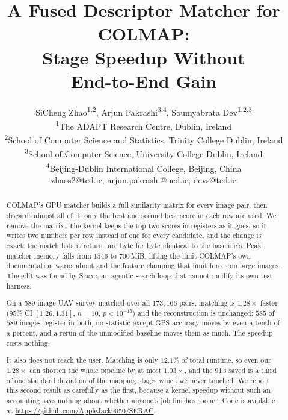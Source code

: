 \documentclass[conference]{IEEEtran}
\newcommand{\sys}{\textnormal{\textsc{Serac}}\xspace}
\begin{document}
\title{A Fused Descriptor Matcher for COLMAP:\\
Stage Speedup Without\\
End-to-End Gain}

\author{SiCheng Zhao\textsuperscript{1,2}, Arjun Pakrashi\textsuperscript{3,4}, Soumyabrata Dev\textsuperscript{1,2,3} \vspace{0.5em}\\ \textsuperscript{1}The ADAPT Research Centre, Dublin, Ireland\\
\textsuperscript{2}School of Computer Science and Statistics, Trinity College Dublin, Ireland\\
\textsuperscript{3}School of Computer Science, University College Dublin, Ireland\\
\textsuperscript{4}Beijing-Dublin International College, Beijing, China\\
zhaos2@tcd.ie, arjun.pakrashi@ucd.ie, devs@tcd.ie}

\maketitle

\begin{abstract}
COLMAP's GPU matcher builds a full similarity matrix for every image pair, then
discards almost all of it: only the best and second best score in each row are
used. We remove the matrix. The kernel keeps the top two scores in registers as
it goes, so it writes two numbers per row instead of one for every candidate,
and the change is exact: the match lists it returns are byte for byte identical
to the baseline's. Peak matcher memory falls from $1546$ to $700$\,MiB, lifting
the limit COLMAP's own documentation warns about and the feature clamping that
limit forces on large images. The edit was found by \sys, an agentic search
loop that cannot modify its own test harness.

On a 589 image UAV survey matched over all $173{,}166$ pairs, matching is
$1.28\times$ faster ($95\%$ CI $[1.26, 1.31]$, $n = 10$, $p < 10^{-15}$) and the
reconstruction is unchanged: $585$ of $589$ images register in both, no
statistic except GPS accuracy moves by even a tenth of a percent, and a rerun
of the unmodified baseline moves them as much. The speedup costs nothing.

It also does not reach the user. Matching is only $12.1\%$ of total runtime, so
even our $1.28\times$ can shorten the whole pipeline by at most $1.03\times$,
and the $91$\,s saved is a third of one standard deviation of the mapping
stage, which we never touched. We
report this second result as carefully as the first, because a kernel speedup
without such an accounting says nothing about whether anyone's job finishes
sooner. Code is available at
\url{https://github.com/AppleJack9050/SERAC}.
\end{abstract}
\end{document}
